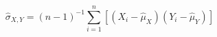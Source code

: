 \begin{equation}
    \hat{\sigma}_{X, Y}
    =
    \left(
      n - 1
    \right)^{-1}
    \sum_{i = 1}^{n}
    \left[
    \left(
    X_{i}
    -
    \hat{\mu}_{X}
    \right)
    \left(
    Y_{i}
    -
    \hat{\mu}_{Y}
    \right)
    \right]
    \label{eq:sigmaMatrix-sigmaxyhat-unbiased}
\end{equation}
